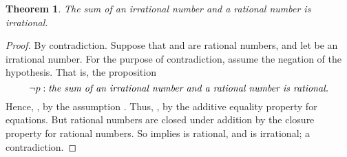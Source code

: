 \documentclass[preview]{standalone}
\newtheorem{theorem}{Theorem}
\begin{document}
\begin{theorem} %
    The sum of an irrational number and a rational number is irrational.
\end{theorem}

\begin{proof}
    By contradiction. Suppose that \bm{$\mu$} and \bm{$\zeta$} are rational numbers, 
    and let \bm{$\chi$} be an irrational number. 
    For the purpose of contradiction, 
    assume the negation of the hypothesis. 
    That is, the proposition 
        $$\lnot p: \emph{the sum of an irrational number and a rational number 
        is rational.}$$
    Hence, \bm{$\chi + \mu = \zeta$}, 
    by the assumption . 
    Thus, 
    \bm{$\chi = \zeta + \big \langle - \mu \big \rangle$}, 
    by the additive equality property for equations. 
    But rational numbers are closed under addition by the closure property for rational numbers. 
    So  implies \bm{$\chi$} is rational, 
    and \bm{$\chi$} is irrational; a contradiction.
\color{lightgray} \end{proof}
\end{document}
